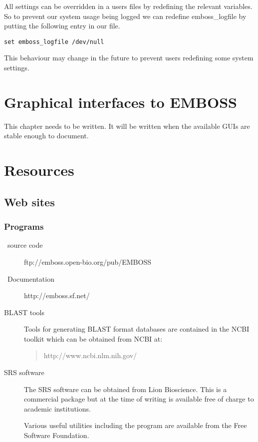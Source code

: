\documentclass{report}
\begin{document}
All settings can be overridden in a users  files
by redefining the relevant variables. So to prevent our system usage
being logged we can redefine emboss\_logfile by putting the following
entry in our  file.

\begin{verbatim}
set emboss_logfile /dev/null
\end{verbatim}

This behaviour may change in the future to prevent users redefining
some system settings.

\chapter{Graphical interfaces to EMBOSS}

This chapter needs to be written. It will be written when the
available GUIs are stable enough to document.

\chapter{Resources}
\section{Web sites}
\subsection{Programs}
\begin{description}
\item[\EMBOSS\ source code]ftp://emboss.open-bio.org/pub/EMBOSS
\item[\EMBOSS\ Documentation]http://emboss.sf.net/
\item[BLAST tools]Tools for generating BLAST format databases are
contained in the NCBI toolkit which can be obtained from NCBI at:
\begin{quote}
http://www.ncbi.nlm.nih.gov/
\end{quote}
\item[SRS software]The SRS software can be obtained from Lion
Bioscience. This is a
commercial package but at the time of writing is available free of
charge to academic institutions.
\item[]Various useful utilities including the
 program are available from the Free Software
Foundation.
\end{description}
\end{document}
